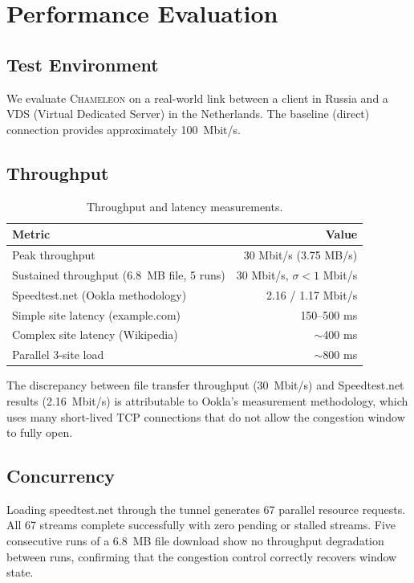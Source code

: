 \documentclass[11pt,a4paper]{article}
\newcommand{\chameleon}{\textsc{Chameleon}}
\begin{document}
\section{Performance Evaluation}\label{sec:eval}

\subsection{Test Environment}

We evaluate \chameleon{} on a real-world link between a client in Russia and a VDS (Virtual Dedicated Server) in the Netherlands. The baseline (direct) connection provides approximately 100~Mbit/s.

\subsection{Throughput}

\begin{table}[htbp]
\centering
\caption{Throughput and latency measurements.}
\label{tab:perf}
\begin{tabular}{@{}lr@{}}
\toprule
\textbf{Metric} & \textbf{Value} \\
\midrule
Peak throughput & 30 Mbit/s (3.75 MB/s) \\
Sustained throughput (6.8~MB file, 5 runs) & 30 Mbit/s, $\sigma < 1$ Mbit/s \\
Speedtest.net (Ookla methodology) & 2.16 / 1.17 Mbit/s \\
Simple site latency (example.com) & 150--500 ms \\
Complex site latency (Wikipedia) & $\sim$400 ms \\
Parallel 3-site load & $\sim$800 ms \\
\bottomrule
\end{tabular}
\end{table}

The discrepancy between file transfer throughput (30~Mbit/s) and Speedtest.net results (2.16~Mbit/s) is attributable to Ookla's measurement methodology, which uses many short-lived TCP connections that do not allow the congestion window to fully open.

\subsection{Concurrency}

Loading speedtest.net through the tunnel generates 67 parallel resource requests. All 67 streams complete successfully with zero pending or stalled streams. Five consecutive runs of a 6.8~MB file download show no throughput degradation between runs, confirming that the congestion control correctly recovers window state.
\end{document}
